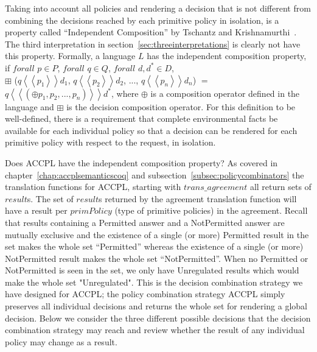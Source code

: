 Taking into account all policies and rendering a decision that is not different from combining the decisions reached by each primitive policy in isolation, is a property called ``Independent Composition'' by Tschantz and Krishnamurthi~\cite{Tschantz}. The third interpretation in section~\ref{sec:threeinterpretations} is clearly not have this property. Formally, a language $L$ has the independent composition property, if $forall$ $p \in P$, $forall$ $q \in Q$, $forall$ $d, d^\ast \in D$, \\$\boxplus$ ($q \left\langle\left\langle p_{1}  \right\rangle\right\rangle d_{1}$, $q \left\langle\left\langle p_{2}  \right\rangle\right\rangle d_{2}$, ..., $q \left\langle\left\langle p_{n}  \right\rangle\right\rangle d_{n}$) $=$ $q \left\langle\left\langle (\oplus p_{1}, p_{2}, ..., p_{n}) \right\rangle\right\rangle d^\ast$, where $\oplus$ is a composition operator defined in the language and $\boxplus$ is the decision composition operator. For this definition to be well-defined, there is a requirement that complete environmental facts be available for each individual policy so that a decision can be rendered for each primitive policy with respect to the request, in isolation.

Does \ac{ACCPL} have the independent composition property? As covered in chapter~\ref{chap:accplsemanticscoq} and subsection~\ref{subsec:policycombinators} the translation functions for \ac{ACCPL}, starting with $trans\_agreement$ all return sets of $result$s.  The set of $result$s returned by the agreement translation function will have a result per $primPolicy$ (type of primitive policies) in the agreement. Recall that results containing a Permitted answer and a NotPermitted answer are mutually exclusive and the existence of a single (or more) Permitted result in the set makes the whole set ``Permitted'' whereas the existence of a single (or more) NotPermitted result makes the whole set ``NotPermitted''. When no Permitted or NotPermitted is seen in the set, we only have Unregulated results which would make the whole set "Unregulated". This is the decision combination strategy we have designed for \ac{ACCPL}; the policy combination strategy \ac{ACCPL} simply preserves all individual decisions and returns the whole set for rendering a global decision. Below we consider the three different possible decisions that the decision combination strategy may reach and review whether the result of any individual policy may change as a result.

